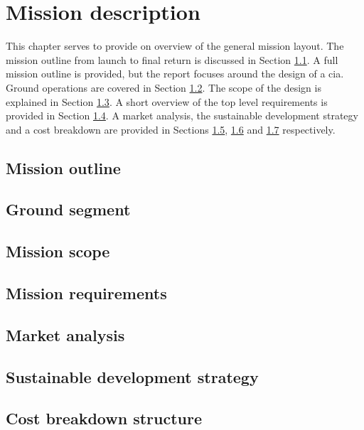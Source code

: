 \section{Mission description}\label{cha:missiondescr}

This chapter serves to provide on overview of the general mission layout. The mission outline from launch to final return is discussed in Section \ref{sec:missionoutline}. A full mission outline is provided, but the report focuses around the design of a \gls{cia}. Ground operations are covered in Section \ref{sec:gop}. The scope of the design is explained in Section \ref{sec:missionscope}. A short overview of the top level requirements is provided in Section \ref{sec:missionreq}. A market analysis, the sustainable development strategy and a cost breakdown are provided in Sections \ref{sec:marketanalysis}, \ref{sec:sustainable} and \ref{sec:costbreakdown} respectively. 


\subsection{Mission outline} \label{sec:missionoutline}


\subsection{Ground segment} \label{sec:gop}


\subsection{Mission scope} \label{sec:missionscope}


\subsection{Mission requirements} \label{sec:missionreq}


\subsection{Market analysis} \label{sec:marketanalysis}


\subsection{Sustainable development strategy} \label{sec:sustainable}


\subsection{Cost breakdown structure} \label{sec:costbreakdown}


%

